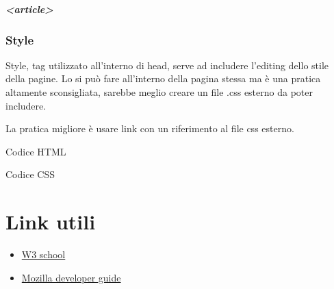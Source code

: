\documentclass[11pt,a4paper]{book}
\begin{document}
\paragraph{<article>}

\subsection{Style}
Style, tag utilizzato all'interno di head, serve ad includere l'editing dello stile della pagine. Lo si può fare all'interno della pagina stessa ma è una pratica altamente sconsigliata, sarebbe meglio creare un file .css esterno da poter includere.

La pratica migliore è usare link con un riferimento al file css esterno.

\begin{center}
	\begin{huge}
		Codice HTML
	\end{huge}
\end{center}


\begin{center}
	\begin{huge}
		Codice CSS
	\end{huge}
\end{center}

\chapter{Link utili}
\begin{itemize}
	\item \href{https://www.w3schools.com/}{W3 school}
	\item \href{https://developer.mozilla.org/it/}{Mozilla developer guide}
\end{itemize}
\end{document}
